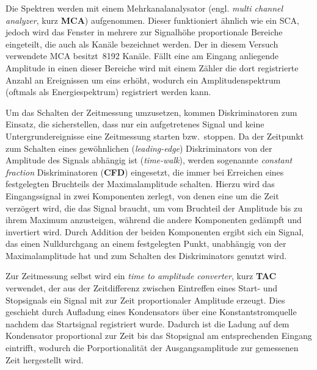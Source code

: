 \documentclass[11pt, a4paper]{article}
\numberwithin{equation}{section}
\begin{document}
Die Spektren werden mit einem Mehrkanalanalysator (engl. \textit{multi channel analyzer}, kurz \textbf{MCA}) aufgenommen.
Dieser funktioniert ähnlich wie ein SCA, jedoch wird das Fenster in mehrere zur Signalhöhe proportionale Bereiche eingeteilt, die auch als Kanäle bezeichnet werden.
Der in diesem Versuch verwendete MCA besitzt~\num{8192} Kanäle.
Fällt eine am Eingang anliegende Amplitude in einen dieser Bereiche wird mit einem Zähler die dort registrierte Anzahl an Ereignissen um eins erhöht, wodurch ein Amplitudenspektrum (oftmals als Energiespektrum) registriert werden kann.

Um das Schalten der Zeitmessung umzusetzen, kommen Diskriminatoren zum Einsatz, die sicherstellen, dass nur ein aufgetretenes Signal und keine Untergrundereignisse eine Zeitmessung starten bzw.\ stoppen.
Da der Zeitpunkt zum Schalten eines gewöhnlichen (\textit{leading-edge}) Diskriminators von der Amplitude des Signals abhängig ist (\textit{time-walk}), werden sogenannte \textit{constant fraction} Diskriminatoren (\textbf{CFD}) eingesetzt, die immer bei Erreichen eines festgelegten Bruchteils der Maximalamplitude schalten.
Hierzu wird das Eingangssignal in zwei Komponenten zerlegt, von denen eine um die Zeit verzögert wird, die das Signal braucht, um vom Bruchteil der Amplitude bis zu ihrem Maximum anzusteigen, während die andere Komponenten gedämpft und invertiert wird.
Durch Addition der beiden Komponenten ergibt sich ein Signal, das einen Nulldurchgang an einem festgelegten Punkt, unabhängig von der Maximalamplitude hat und zum Schalten des Diskriminators  genutzt wird.

Zur Zeitmessung selbst wird ein \textit{time to amplitude converter}, kurz \textbf{TAC} verwendet, der aus der Zeitdifferenz zwischen Eintreffen eines Start- und Stopsignals ein Signal mit zur Zeit proportionaler Amplitude erzeugt.
Dies geschieht durch Aufladung eines Kondensators über eine Konstantstromquelle nachdem das Startsignal registriert wurde.
Dadurch ist die Ladung auf dem Kondensator proportional zur Zeit bis das Stopsignal am entsprechenden Eingang eintrifft, wodurch die Porportionalität der Ausgangsamplitude zur gemessenen Zeit hergestellt wird. 
\end{document}
